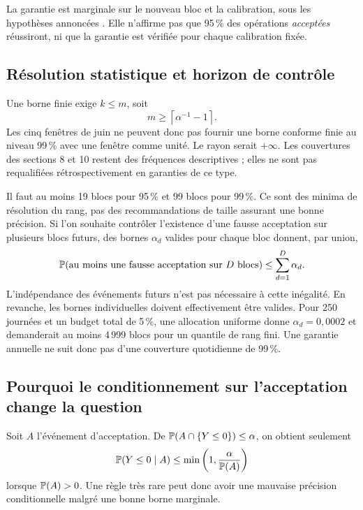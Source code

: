 La garantie est marginale sur le nouveau bloc et la calibration, sous les hypothèses annoncées \cite{ext-lei}. Elle n'affirme pas que 95\,\% des opérations \emph{acceptées} réussiront, ni que la garantie est vérifiée pour chaque calibration fixée.

\subsection{Résolution statistique et horizon de contrôle}

Une borne finie exige \(k\le m\), soit
\begin{equation}
 m\ge\left\lceil\alpha^{-1}-1\right\rceil.
 \label{eq:ext-minimum-m}
\end{equation}
Les cinq fenêtres de juin ne peuvent donc pas fournir une borne conforme finie au niveau 99\,\% avec une fenêtre comme unité. Le rayon serait \(+\infty\). Les couvertures des sections 8 et 10 restent des fréquences descriptives ; elles ne sont pas requalifiées rétrospectivement en garanties de ce type.

Il faut au moins 19 blocs pour 95\,\% et 99 blocs pour 99\,\%. Ce sont des minima de résolution du rang, pas des recommandations de taille assurant une bonne précision. Si l'on souhaite contrôler l'existence d'une fausse acceptation sur plusieurs blocs futurs, des bornes \(\alpha_d\) valides pour chaque bloc donnent, par union,
\[
 \mathbb P(\hbox{au moins une fausse acceptation sur }D\hbox{ blocs})\le\sum_{d=1}^D\alpha_d.
\]
L'indépendance des événements futurs n'est pas nécessaire à cette inégalité. En revanche, les bornes individuelles doivent effectivement être valides. Pour 250 journées et un budget total de 5\,\%, une allocation uniforme donne \(\alpha_d=0{,}0002\) et demanderait au moins 4\,999 blocs pour un quantile de rang fini. Une garantie annuelle ne suit donc pas d'une couverture quotidienne de 99\,\%.

\subsection{Pourquoi le conditionnement sur l'acceptation change la question}

Soit \(A\) l'événement d'acceptation. De \(\mathbb P(A\cap\{Y\le0\})\le\alpha\), on obtient seulement
\begin{equation}
 \mathbb P(Y\le0\mid A)\le\min\left(1,\frac{\alpha}{\mathbb P(A)}\right)
 \label{eq:ext-selection-gap}
\end{equation}
lorsque \(\mathbb P(A)>0\). Une règle très rare peut donc avoir une mauvaise précision conditionnelle malgré une bonne borne marginale.

